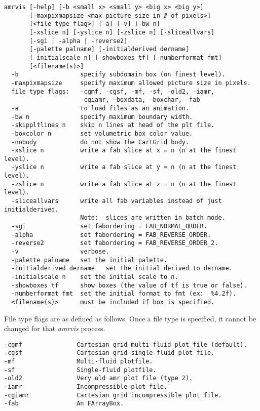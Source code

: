 \begin{verbatim}
amrvis [-help] [-b <small x> <small y> <big x> <big y>]
       [-maxpixmapsize <max picture size in # of pixels>]
       [<file type flag>] [-a] [-v] [-bw n] 
       [-xslice n] [-yslice n] [-zslice n] [-sliceallvars]
       [-sgi | -alpha | -reverse2]
       [-palette palname] [-initialderived dername]
       [-initialscale n] [-showboxes tf] [-numberformat fmt]
       [<filename(s)>]
  -b                 specify subdomain box (on finest level).
  -maxpixmapsize     specify maximum allowed picture size in pixels.
  file type flags:   -cgmf, -cgsf, -mf, -sf, -old2, -iamr,
                     -cgiamr, -boxdata, -boxchar, -fab
  -a                 to load files as an animation.
  -bw n              specify maximum boundary width.
  -skippltlines n    skip n lines at head of the plt file.
  -boxcolor n        set volumetric box color value.
  -nobody            do not show the CartGrid body.
  -xslice n          write a fab slice at x = n (n at the finest level).
  -yslice n          write a fab slice at y = n (n at the finest level).
  -zslice n          write a fab slice at z = n (n at the finest level).
  -sliceallvars      write all fab variables instead of just initialderived.
                     Note:  slices are written in batch mode.
  -sgi               set fabordering = FAB_NORMAL_ORDER.
  -alpha             set fabordering = FAB_REVERSE_ORDER.
  -reverse2          set fabordering = FAB_REVERSE_ORDER_2.
  -v                 verbose.
  -palette palname   set the initial palette.
  -initialderived dername   set the initial derived to dername.
  -initialscale n    set the initial scale to n.
  -showboxes tf      show boxes (the value of tf is true or false).
  -numberformat fmt  set the initial format to fmt (ex:  %4.2f).
  <filename(s)>      must be included if box is specified.
\end{verbatim}


File type flags are as defined as follows.  Once a file type is specified,
it cannot be changed for that {\em amrvis} process.

\begin{verbatim}
-cgmf               Cartesian grid multi-fluid plot file (default).
-cgsf               Cartesian grid single-fluid plot file.
-mf                 Multi-fluid plotfile.
-sf                 Single-fluid plotfile.
-old2               Very old amr plot file (type 2).
-iamr               Incompressible plot file.
-cgiamr             Cartesian grid incompressible plot file.
-fab                An FArrayBox.
\end{verbatim}

